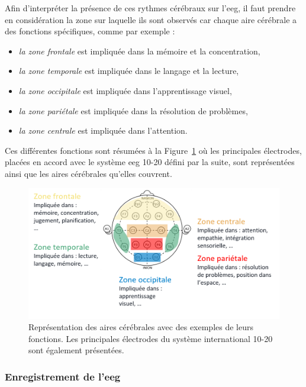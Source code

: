 Afin d'interpréter la présence de ces rythmes cérébraux sur l'\gls{eeg}, il faut prendre en considération la zone sur laquelle ils sont observés 
car chaque aire cérébrale a des fonctions spécifiques, comme par exemple \citep{Marzbani2016} :
\begin{itemize}
\item \emph{la zone frontale} est impliquée dans la mémoire et la concentration,
\item \emph{la zone temporale} est impliquée dans le langage et la lecture,
\item \emph{la zone occipitale }est impliquée dans l'apprentissage visuel,
\item \emph{la zone pariétale} est impliquée dans la résolution de problèmes,
\item \emph{la zone centrale} est impliquée dans l'attention.
\end{itemize}

Ces différentes fonctions sont résumées à la Figure~\ref{Figure:introduction_cortical_areas_and_functions} où les principales électrodes, placées en accord avec le système \gls{eeg} 10-20 
défini par la suite, sont représentées ainsi que les aires cérébrales qu'elles couvrent. 

\begin{figure}[h!]
  \centering
	\includegraphics[width=1\linewidth]{figures/chapter-1/introduction-cortical-areas-and-functions} 
  \caption{Représentation des aires cérébrales avec des exemples de leurs fonctions. Les principales électrodes du système international 10-20 sont également présentées.}
  \label{Figure:introduction_cortical_areas_and_functions}
\end{figure}

\subsubsection{Enregistrement de l'\gls{eeg}}

